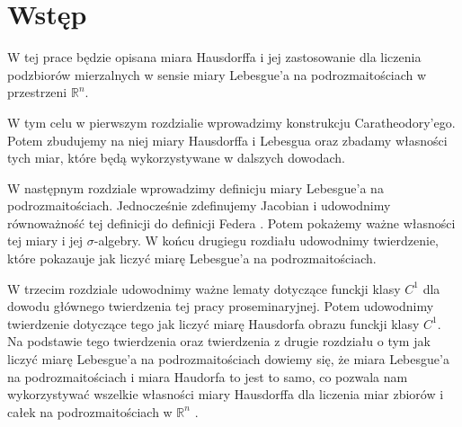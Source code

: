 \chapter*{Wstęp}


W tej prace będzie opisana miara Hausdorffa i jej zastosowanie dla liczenia podzbiorów mierzalnych w sensie miary Lebesgue'a na podrozmaitościach w przestrzeni $\mathbb{R}^n$.

W tym celu w pierwszym rozdzialie wprowadzimy konstrukcju Caratheodory'ego. Potem zbudujemy na niej miary Hausdorffa i Lebesgua oraz zbadamy własności tych miar, które będą wykorzystywane w dalszych dowodach.

W następnym rozdziale wprowadzimy definicju miary Lebesgue'a na podrozmaitościach. Jednocześnie zdefinujemy Jacobian i udowodnimy równoważność tej definicji do definicji Federa \citep{Federer}. Potem pokażemy ważne własności tej miary i jej $\sigma$-algebry. W końcu drugiegu rozdiału udowodnimy twierdzenie, które pokazauje jak liczyć miarę Lebesgue'a na podrozmaitościach.

W trzecim rozdziale udowodnimy ważne lematy dotyczące funckji klasy $C^1$ dla dowodu głównego twierdzenia tej pracy proseminaryjnej. Potem udowodnimy twierdzenie dotyczące tego jak liczyć miarę Hausdorfa obrazu funckji klasy $C^1$. Na podstawie tego twierdzenia oraz twierdzenia z drugie rozdziału o tym jak liczyć miarę Lebesgue'a na podrozmaitościach dowiemy się, że miara Lebesgue'a na podrozmaitościach i miara Haudorfa to jest to samo, co pozwala nam wykorzystywać wszelkie własności miary Hausdorffa dla liczenia miar zbiorów i całek na podrozmaitościach w $\mathbb{R}^n$ .
